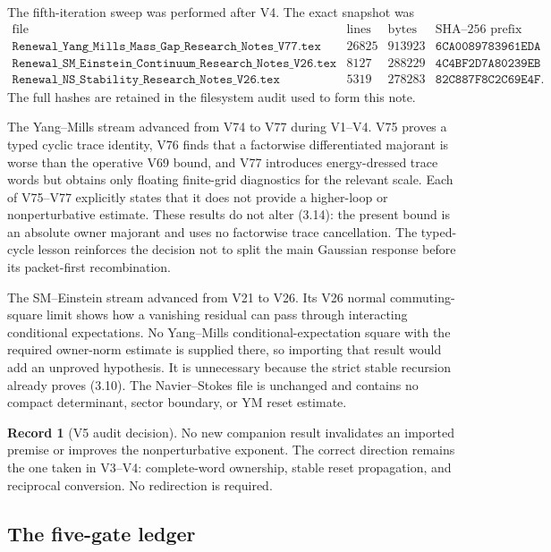 \documentclass[11pt]{article}
\theoremstyle{definition}
\newtheorem{record}[theorem]{Record}
\theoremstyle{remark}
\begin{document}
The fifth-iteration sweep was performed after V4.  The exact snapshot was
\[
\begin{array}{l|r|r|l}
\text{file}&\text{lines}&\text{bytes}&\text{SHA--256 prefix}\\ \hline
\texttt{Renewal\_Yang\_Mills\_Mass\_Gap\_Research\_Notes\_V77.tex}
&26825&913923&\texttt{6CA0089783961EDA}\\
\texttt{Renewal\_SM\_Einstein\_Continuum\_Research\_Notes\_V26.tex}
&8127&288229&\texttt{4C4BF2D7A80239EB}\\
\texttt{Renewal\_NS\_Stability\_Research\_Notes\_V26.tex}
&5319&278283&\texttt{82C887F8C2C69E4F}.
\end{array}                                                   \tag{5.1}
\]
The full hashes are retained in the filesystem audit used to form this note.

The Yang--Mills stream advanced from V74 to V77 during V1--V4.  V75 proves a
typed cyclic trace identity, V76 finds that a factorwise differentiated
majorant is worse than the operative V69 bound, and V77 introduces
energy-dressed trace words but obtains only floating finite-grid diagnostics
for the relevant scale.  Each of V75--V77 explicitly states that it does not
provide a higher-loop or nonperturbative estimate.  These results do not alter
(3.14): the present bound is an absolute owner majorant and uses no
factorwise trace cancellation.  The typed-cycle lesson reinforces the decision
not to split the main Gaussian response before its packet-first recombination.

The SM--Einstein stream advanced from V21 to V26.  Its V26 normal
commuting-square limit shows how a vanishing residual can pass through
interacting conditional expectations.  No Yang--Mills conditional-expectation
square with the required owner-norm estimate is supplied there, so importing
that result would add an unproved hypothesis.  It is unnecessary because the
strict stable recursion already proves (3.10).  The Navier--Stokes file is
unchanged and contains no compact determinant, sector boundary, or YM reset
estimate.

\begin{record}[V5 audit decision]
No new companion result invalidates an imported premise or improves the
nonperturbative exponent.  The correct direction remains the one taken in
V3--V4: complete-word ownership, stable reset propagation, and reciprocal
conversion.  No redirection is required.
\end{record}

\subsection{The five-gate ledger}
\end{document}
